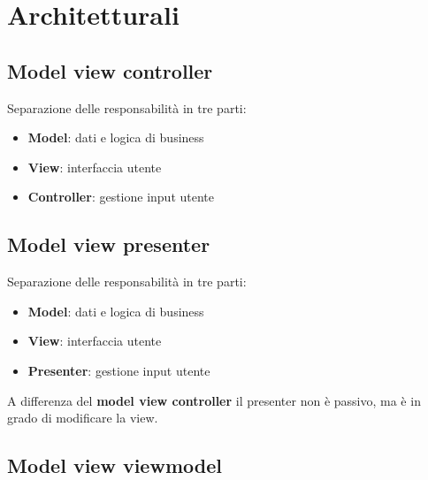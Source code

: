 \section{Architetturali}

\subsection{Model view controller}
Separazione delle responsabilità in tre parti:
\begin{itemize}
    \item \textbf{Model}: dati e logica di business
    \item \textbf{View}: interfaccia utente
    \item \textbf{Controller}: gestione input utente
\end{itemize}


\subsection{Model view presenter}
Separazione delle responsabilità in tre parti:
\begin{itemize}
    \item \textbf{Model}: dati e logica di business
    \item \textbf{View}: interfaccia utente
    \item \textbf{Presenter}: gestione input utente
\end{itemize}
A differenza del \textbf{model view controller} il presenter non è passivo, ma è in grado di modificare la view.

\subsection{Model view viewmodel}